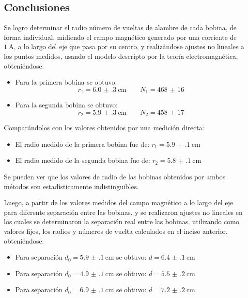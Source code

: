 \documentclass[12pt,a4paper]{article}
\begin{document}
\subsection*{Conclusiones}

Se logro determinar el radio número de vueltas de alambre de cada bobina, de forma individual, midiendo el campo magnético generado por una corriente de $\SI{1}{\ampere}$, a lo largo del eje que pasa por su centro, y realizándose ajustes no lineales a los puntos medidos, usando el modelo descripto por la teoría electromagnética, obteniéndose:
\begin{itemize}

\item Para la primera bobina se obtuvo: $$r_1 = \SI{6.0(3)}{\centi\meter} \qquad N_1 = \SI{468(16)}{} $$

\item Para la segunda bobina se obtuvo: $$r_2 = \SI{5.9(3)}{\centi\meter} \qquad N_2 = \SI{458(17)}{} $$

\end{itemize}

Comparándolos con los valores obtenidos por una medición directa:

\begin{itemize}

\item El radio medido de la primera bobina fue de: $r_1 = \SI{5.9(1)}{\centi\meter}$

\item  El radio medido de la segunda bobina fue de: $r_2 = \SI{5.8(1)}{\centi\meter}$
\end{itemize}


Se pueden ver que los valores de radio de las bobinas obtenidos por ambos métodos son estad\'isticamente indistinguibles. 

\hspace{1cm}

Luego, a partir de los valores medidos del campo magnético a lo largo del eje para diferente separación entre las bobinas, y se realizaron ajustes no lineales en los cuales se determinaron la separación real entre las bobinas, utilizando como valores fijos, los radios y números de vuelta calculados en el inciso anterior, obteniéndose: 

\begin{itemize}
	\item Para separación $d_0 = \SI{5.9(1)}{\centi\meter}$ se obtuvo: $d = \SI{6.4(1)}{\centi\meter}$

	\item Para separación $d_0 = \SI{4.9(1)}{\centi\meter}$ se obtuvo: $d = \SI{5.5(2)}{\centi\meter}$
	
	\item Para separación $d_0 = \SI{6.9(1)}{\centi\meter}$ se obtuvo: $d = \SI{7.2(2)}{\centi\meter}$

\end{itemize}
\end{document}
